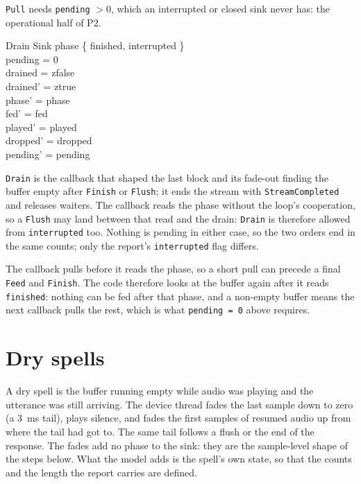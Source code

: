 \documentclass[a4paper,10pt,fleqn]{article}
\begin{document}
\texttt{Pull} needs \texttt{pending} $> 0$, which an interrupted or closed sink
never has: the operational half of P2.

\begin{schema}{Drain}
  \Delta Sink
\where
  phase \in \{ finished, interrupted \} \\
  pending = 0 \\
  drained = zfalse \\
  drained' = ztrue \\
  phase' = phase \\
  fed' = fed \\
  played' = played \\
  dropped' = dropped \\
  pending' = pending
\end{schema}

\texttt{Drain} is the callback that shaped the last block and its fade-out
finding the buffer empty after \texttt{Finish} or \texttt{Flush}; it ends the
stream with \texttt{StreamCompleted} and releases waiters. The callback reads the phase without
the loop's cooperation, so a \texttt{Flush} may land between that read and
the drain: \texttt{Drain} is therefore allowed from \texttt{interrupted}
too. Nothing is pending in either case, so the two orders end in the same
counts; only the report's \texttt{interrupted} flag differs.

The callback pulls before it reads the phase, so a short pull can precede a
final \texttt{Feed} and \texttt{Finish}. The code therefore looks at the
buffer again after it reads \texttt{finished}: nothing can be fed after that
phase, and a non-empty buffer means the next callback pulls the rest, which is
what \texttt{pending = 0} above requires.

\section{Dry spells}

A dry spell is the buffer running empty while audio was playing and the
utterance was still arriving. The device thread fades the last sample down to
zero (a 3~ms tail), plays silence, and fades the first samples of resumed
audio up from where the tail had got to. The same tail follows a flush or the
end of the response. The fades add no phase to the sink: they are the
sample-level shape of the steps below. What the model adds is the spell's own
state, so that the counts and the length the report carries are defined.
\end{document}

